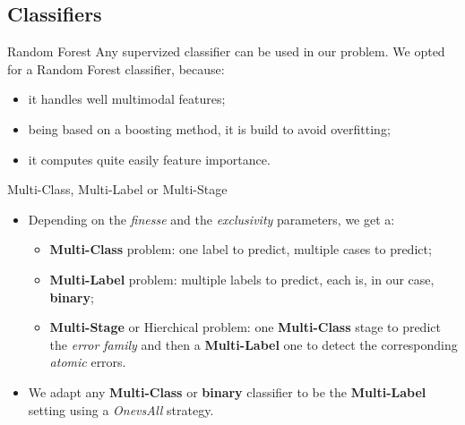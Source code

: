 \documentclass{beamer}
\begin{document}
        \subsection{Classifiers}
            \begin{frame}{Random Forest}
                Any supervized classifier can be used in our problem. We opted for a Random Forest classifier, because:
                \begin{itemize}[label=$\blacktriangleright$, font=\color{IGNGreen}]
                    \item<1-> it handles well multimodal features;
                    \item<2-> being based on a boosting method, it is build to avoid overfitting;
                    \item<3-> it computes quite easily feature importance.
                \end{itemize}
            \end{frame}
            \begin{frame}{Multi-Class, Multi-Label or Multi-Stage}
                \begin{itemize}[label=$\blacktriangleright$, font=\color{IGNGreen}]
                    \item<1-> Depending on the \emph{finesse} and the \emph{exclusivity} parameters, we get a:
                    \begin{itemize}[label=--]
                        \item<2-> \textbf{Multi-Class} problem: one label to predict, multiple cases to predict;
                        \item<3-> \textbf{Multi-Label} problem: multiple labels to predict, each is, in our case, \textbf{binary};
                        \item<4-> \textbf{Multi-Stage} or Hierchical problem: one \textbf{Multi-Class} stage to predict the \emph{error family} and then a \textbf{Multi-Label} one to detect the corresponding \emph{atomic} errors.
                    \end{itemize}
                    \item<5-> We adapt any \textbf{Multi-Class} or \textbf{binary} classifier to be the \textbf{Multi-Label} setting using a \emph{OnevsAll} strategy.
                \end{itemize}
            \end{frame}
\end{document}
